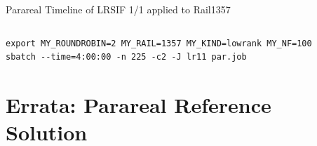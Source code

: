 \begin{frame}[b,fragile,label=rail1357]{Parareal Timeline of LRSIF 1/1 applied to Rail1357}
\begin{columns}[T]
  \end{columns}
  \vfill
  \begin{lstlisting}
export MY_ROUNDROBIN=2 MY_RAIL=1357 MY_KIND=lowrank MY_NF=100
sbatch --time=4:00:00 -n 225 -c2 -J lr11 par.job
  \end{lstlisting}
\end{frame}

\section{Errata: Parareal Reference Solution}

